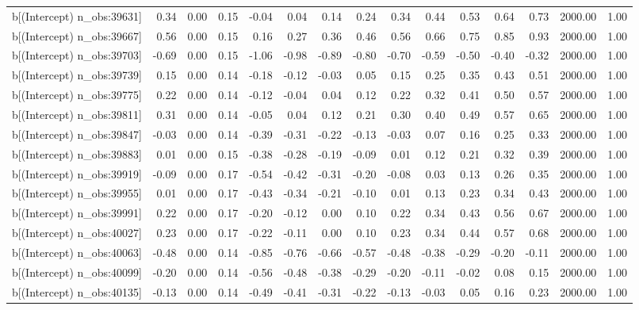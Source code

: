 \begin{table}[ht]
\begin{tabular}{rrrrrrrrrrrrrrr}
  b[(Intercept) n\_obs:39631] & 0.34 & 0.00 & 0.15 & -0.04 & 0.04 & 0.14 & 0.24 & 0.34 & 0.44 & 0.53 & 0.64 & 0.73 & 2000.00 & 1.00 \\ 
  b[(Intercept) n\_obs:39667] & 0.56 & 0.00 & 0.15 & 0.16 & 0.27 & 0.36 & 0.46 & 0.56 & 0.66 & 0.75 & 0.85 & 0.93 & 2000.00 & 1.00 \\ 
  b[(Intercept) n\_obs:39703] & -0.69 & 0.00 & 0.15 & -1.06 & -0.98 & -0.89 & -0.80 & -0.70 & -0.59 & -0.50 & -0.40 & -0.32 & 2000.00 & 1.00 \\ 
  b[(Intercept) n\_obs:39739] & 0.15 & 0.00 & 0.14 & -0.18 & -0.12 & -0.03 & 0.05 & 0.15 & 0.25 & 0.35 & 0.43 & 0.51 & 2000.00 & 1.00 \\ 
  b[(Intercept) n\_obs:39775] & 0.22 & 0.00 & 0.14 & -0.12 & -0.04 & 0.04 & 0.12 & 0.22 & 0.32 & 0.41 & 0.50 & 0.57 & 2000.00 & 1.00 \\ 
  b[(Intercept) n\_obs:39811] & 0.31 & 0.00 & 0.14 & -0.05 & 0.04 & 0.12 & 0.21 & 0.30 & 0.40 & 0.49 & 0.57 & 0.65 & 2000.00 & 1.00 \\ 
  b[(Intercept) n\_obs:39847] & -0.03 & 0.00 & 0.14 & -0.39 & -0.31 & -0.22 & -0.13 & -0.03 & 0.07 & 0.16 & 0.25 & 0.33 & 2000.00 & 1.00 \\ 
  b[(Intercept) n\_obs:39883] & 0.01 & 0.00 & 0.15 & -0.38 & -0.28 & -0.19 & -0.09 & 0.01 & 0.12 & 0.21 & 0.32 & 0.39 & 2000.00 & 1.00 \\ 
  b[(Intercept) n\_obs:39919] & -0.09 & 0.00 & 0.17 & -0.54 & -0.42 & -0.31 & -0.20 & -0.08 & 0.03 & 0.13 & 0.26 & 0.35 & 2000.00 & 1.00 \\ 
  b[(Intercept) n\_obs:39955] & 0.01 & 0.00 & 0.17 & -0.43 & -0.34 & -0.21 & -0.10 & 0.01 & 0.13 & 0.23 & 0.34 & 0.43 & 2000.00 & 1.00 \\ 
  b[(Intercept) n\_obs:39991] & 0.22 & 0.00 & 0.17 & -0.20 & -0.12 & 0.00 & 0.10 & 0.22 & 0.34 & 0.43 & 0.56 & 0.67 & 2000.00 & 1.00 \\ 
  b[(Intercept) n\_obs:40027] & 0.23 & 0.00 & 0.17 & -0.22 & -0.11 & 0.00 & 0.10 & 0.23 & 0.34 & 0.44 & 0.57 & 0.68 & 2000.00 & 1.00 \\ 
  b[(Intercept) n\_obs:40063] & -0.48 & 0.00 & 0.14 & -0.85 & -0.76 & -0.66 & -0.57 & -0.48 & -0.38 & -0.29 & -0.20 & -0.11 & 2000.00 & 1.00 \\ 
  b[(Intercept) n\_obs:40099] & -0.20 & 0.00 & 0.14 & -0.56 & -0.48 & -0.38 & -0.29 & -0.20 & -0.11 & -0.02 & 0.08 & 0.15 & 2000.00 & 1.00 \\ 
  b[(Intercept) n\_obs:40135] & -0.13 & 0.00 & 0.14 & -0.49 & -0.41 & -0.31 & -0.22 & -0.13 & -0.03 & 0.05 & 0.16 & 0.23 & 2000.00 & 1.00 \\ 

\end{tabular}
\end{table}
